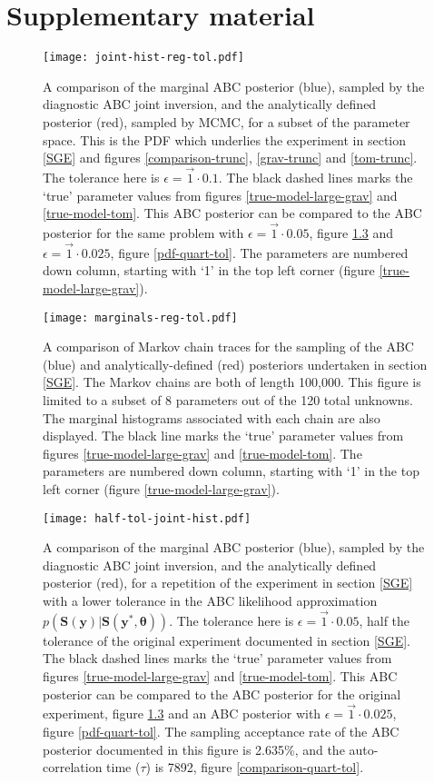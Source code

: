 \chapter{Supplementary material}
\label{supplementary-material}
\newpage
\begin{figure}[H]
	\centering
	\texttt{[image: joint-hist-reg-tol.pdf]}
	\caption{A comparison of the marginal ABC posterior (blue), sampled by the diagnostic ABC joint inversion, and the analytically defined posterior (red), sampled by MCMC, for a subset of the parameter space. This is the PDF which underlies the experiment in section \ref{SGE} and figures \ref{comparison-trunc}, \ref{grav-trunc} and \ref{tom-trunc}. The tolerance here is $\epsilon = \vec{1}\cdot0.1$. The black dashed lines marks the `true' parameter values from figures \ref{true-model-large-grav} and \ref{true-model-tom}. This ABC posterior can be compared to the ABC posterior for the same problem with $\epsilon = \vec{1}\cdot0.05$, figure \ref{pdf-half-tol} and $\epsilon = \vec{1}\cdot0.025$, figure \ref{pdf-quart-tol}. The parameters are numbered down column, starting with `1' in the top left corner (figure \ref{true-model-large-grav}).}
	\label{pdf-reg-tol}
\end{figure}

\begin{figure}[H]
	\centering
	\texttt{[image: marginals-reg-tol.pdf]}
	\caption{A comparison of Markov chain traces for the sampling of the ABC (blue) and analytically-defined (red) posteriors undertaken in section \ref{SGE}. The Markov chains are both of length 100,000. This figure is limited to a subset of 8 parameters out of the 120 total unknowns. The marginal histograms associated with each chain are also displayed. The black line marks the `true' parameter values from figures \ref{true-model-large-grav} and \ref{true-model-tom}. The parameters are numbered down column, starting with `1' in the top left corner (figure \ref{true-model-large-grav}).}
	\label{marginal-reg-tol}
\end{figure}

\begin{figure}[H]
	\centering
	\texttt{[image: half-tol-joint-hist.pdf]}
	\caption{A comparison of the marginal ABC posterior (blue), sampled by the diagnostic ABC joint inversion, and the analytically defined posterior (red), for a repetition of the experiment in section \ref{SGE} with a lower tolerance in the ABC likelihood approximation $p(\bm{S}(\bm{y})|\bm{S}(\bm{y^*},\bm{\theta}))$. The tolerance here is $\epsilon = \vec{1}\cdot0.05$, half the tolerance of the original experiment documented in section \ref{SGE}. The black dashed lines marks the `true' parameter values from figures \ref{true-model-large-grav} and \ref{true-model-tom}. This ABC posterior can be compared to the ABC posterior for the original experiment, figure \ref{pdf-half-tol} and an ABC posterior with $\epsilon = \vec{1}\cdot0.025$, figure \ref{pdf-quart-tol}. The sampling acceptance rate of the ABC posterior documented in this figure is 2.635\%, and the auto-correlation time ($\tau$) is 7892, figure \ref{comparison-quart-tol}.}
	\label{pdf-half-tol}
\end{figure}

